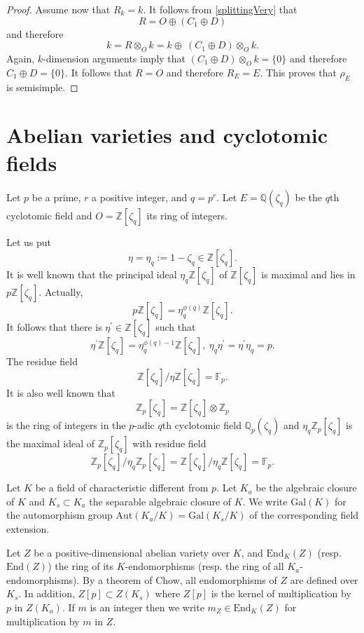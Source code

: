 \documentclass[12pt,a4paper,reqno]{amsart}
\def\Q{{\mathbb Q}}
\def\Z{{\mathbb Z}}
\def\F{{\mathbb F}}
\def\Gal{\mathrm{Gal}}
\def\End{\mathrm{End}}
\def\Aut{\mathrm{Aut}}
\theoremstyle{definition}
\begin{document}
\begin{proof}
 Assume now that $R_{k}=k$. It follows from \eqref{splittingVery} that
 $$R=O\oplus (C_1\oplus D)$$ and therefore
 $$k=R\otimes_O k=k\oplus  \ (C_1\oplus D)\otimes_O k.$$
 Again, $k$-dimension arguments imply that  $(C_1\oplus D)\otimes_O k=\{0\}$ and therefore
 $C_1\oplus D=\{0\}$. It follows that $R=O$ and therefore $R_E=E$. This proves that $\rho_E$ is semisimple.
 \end{proof}

\section{Abelian varieties and cyclotomic fields}
\label{cyclotomicA}

Let $p$ be  a prime, $r$ a positive integer, and $q=p^r$. Let $E=\Q(\zeta_q)$ be the $q$th  cyclotomic field
and $O=\Z[\zeta_q]$ its ring of integers.

Let us put 
$$\eta=\eta_q:=1-\zeta_q\in \Z[\zeta_q].$$
It is well known \cite{W} that the principal ideal $\eta_q \Z[\zeta_q]$ of $\Z[\zeta_q]$ is maximal and lies in $p \Z[\zeta_q]$. Actually,
$$p \Z[\zeta_q] =\eta_q^{\phi(q)}  \Z[\zeta_q].$$
It follows that there is $\eta^{\prime} \in  \Z[\zeta_q]$ such that
\begin{equation}
\label{cycloPrime}
\eta^{\prime}  \Z[\zeta_q]=\eta_q^{\phi(q)-1}  \Z[\zeta_q], \ \eta_q \eta^{\prime}=\eta^{\prime}\eta_q=p.
\end{equation}
The residue field 
$$\Z[\zeta_q]/\eta \Z[\zeta_q]=\F_p.$$
It is also well known \cite{W} that 
$$\Z_p[\zeta_q]=\Z[\zeta_q]\otimes \Z_p$$
 is the ring of integers in the $p$-adic   $q$th cyclotomic field $\Q_p(\zeta_q)$
and $\eta_q \Z_p[\zeta_q]$ is the maximal ideal of $\Z_p[\zeta_q]$ with residue field 
$$\Z_p[\zeta_q]/\eta_q \Z_p[\zeta_q]=\Z[\zeta_q]/\eta_q \Z[\zeta_q]=\F_p.$$


Let $K$ be a field of characteristic different from $p$. Let $K_a$ be the algebraic closure of $K$ and $K_s\subset K_a$ the separable
algebraic closure of $K$. We write $\Gal(K)$ for the automorphism group $\Aut(K_a/K)=\Gal(K_s/K)$ of the corresponding field extension.

Let $Z$ be a positive-dimensional abelian variety over $K$, and $\End_K(Z)$ (resp. $\End(Z)$) the ring of its $K$-endomorphisms
(resp. the ring of all $K_a$-endomorphisms). By a theorem of Chow, all endomorphisms of $Z$ are defined over $K_s$.
In addition, $Z[p]\subset Z(K_s)$ where $Z[p]$ is the kernel of multiplication by $p$ in $Z(K_a)$. If $m$ is an integer then we write
$m_Z\in \End_K(Z)$ for multiplication by $m$ in $Z$.
\end{document}
